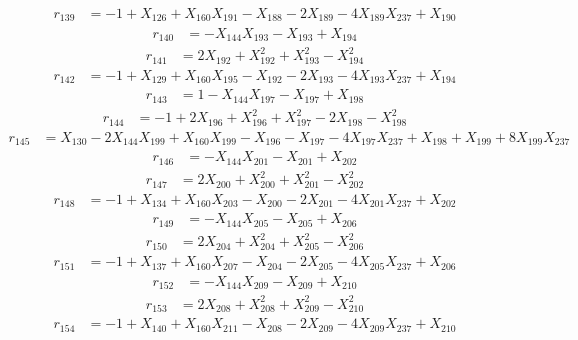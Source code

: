 \begin{align*}
r_{139}&=-1+X_{126}+X_{160}X_{191}-X_{188}-2X_{189}-4X_{189}X_{237}+X_{190}
\end{align*}
\begin{align*}
r_{140}&=-X_{144}X_{193}-X_{193}+X_{194}
\end{align*}
\begin{align*}
r_{141}&=2X_{192}+X_{192}^{2}+X_{193}^{2}-X_{194}^{2}
\end{align*}
\begin{align*}
r_{142}&=-1+X_{129}+X_{160}X_{195}-X_{192}-2X_{193}-4X_{193}X_{237}+X_{194}
\end{align*}
\begin{align*}
r_{143}&=1-X_{144}X_{197}-X_{197}+X_{198}
\end{align*}
\begin{align*}
r_{144}&=-1+2X_{196}+X_{196}^{2}+X_{197}^{2}-2X_{198}-X_{198}^{2}
\end{align*}
\begin{align*}
r_{145}&=X_{130}-2X_{144}X_{199}+X_{160}X_{199}-X_{196}-X_{197}-4X_{197}X_{237}+X_{198}+X_{199}+8X_{199}X_{237}
\end{align*}
\begin{align*}
r_{146}&=-X_{144}X_{201}-X_{201}+X_{202}
\end{align*}
\begin{align*}
r_{147}&=2X_{200}+X_{200}^{2}+X_{201}^{2}-X_{202}^{2}
\end{align*}
\begin{align*}
r_{148}&=-1+X_{134}+X_{160}X_{203}-X_{200}-2X_{201}-4X_{201}X_{237}+X_{202}
\end{align*}
\begin{align*}
r_{149}&=-X_{144}X_{205}-X_{205}+X_{206}
\end{align*}
\begin{align*}
r_{150}&=2X_{204}+X_{204}^{2}+X_{205}^{2}-X_{206}^{2}
\end{align*}
\begin{align*}
r_{151}&=-1+X_{137}+X_{160}X_{207}-X_{204}-2X_{205}-4X_{205}X_{237}+X_{206}
\end{align*}
\begin{align*}
r_{152}&=-X_{144}X_{209}-X_{209}+X_{210}
\end{align*}
\begin{align*}
r_{153}&=2X_{208}+X_{208}^{2}+X_{209}^{2}-X_{210}^{2}
\end{align*}
\begin{align*}
r_{154}&=-1+X_{140}+X_{160}X_{211}-X_{208}-2X_{209}-4X_{209}X_{237}+X_{210}
\end{align*}

